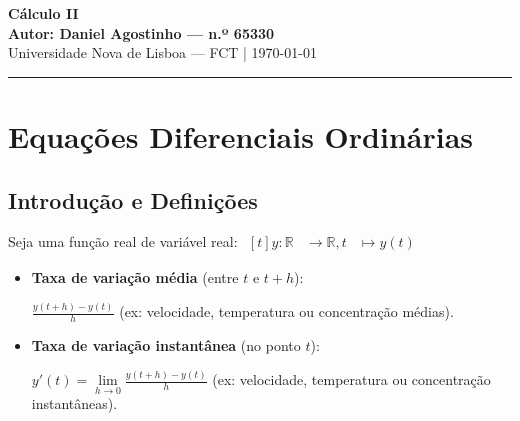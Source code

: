\documentclass[11pt,a4paper]{article}
\newcommand{\R}{\mathbb{R}}
\begin{document}
\begin{center}
  {\Huge\bfseries\color{primaryColor} Cálculo II}\\[0.4cm]
  {\large\bfseries Autor: Daniel Agostinho --- n.º 65330}\\[0.2cm]
  {\large\color{darkGray} Universidade Nova de Lisboa --- FCT \quad | \quad \today}\\[0.4cm]
  \rule{\linewidth}{1.5pt}
\end{center}

\vspace{0.5em}
\tableofcontents
\newpage


\section{Equações Diferenciais Ordinárias}
\label{chap:edo}

\subsection{Introdução e Definições}

Seja uma função real de variável real: $\begin{aligned}[t] y: \R &\to \R, t &\mapsto y(t) \end{aligned}$ \\
\begin{itemize}
  \item \textbf{Taxa de variação média} (entre $t$ e $t+h$): \\ \centerline{$\frac{y(t+h) - y(t)}{h}$ (ex: velocidade, temperatura ou concentração médias).}
  \vspace {1em}
  \item \textbf{Taxa de variação instantânea} (no ponto $t$): \\ \centerline{$y'(t) = \lim\limits_{h\to 0} \frac{y(t+h) - y(t)}{h}$ (ex: velocidade, temperatura ou concentração instantâneas).}
\end{itemize}

\vspace {1em}
\end{document}
